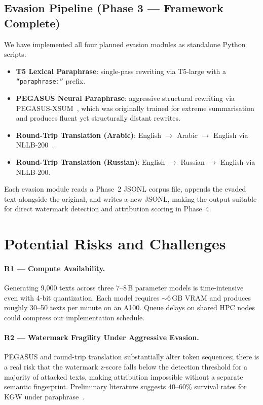 \documentclass[11pt]{article}
\begin{document}
\subsection{Evasion Pipeline (Phase 3 — Framework Complete)}

We have implemented all four planned evasion modules as standalone Python
scripts:

\begin{itemize}
  \item \textbf{T5 Lexical Paraphrase}: single-pass rewriting via T5-large with
    a \texttt{``paraphrase:''} prefix.
  \item \textbf{PEGASUS Neural Paraphrase}: aggressive structural rewriting via
    PEGASUS-XSUM~\cite{zhang2020pegasus}, which was originally trained for
    extreme summarisation and produces fluent yet structurally distant rewrites.
  \item \textbf{Round-Trip Translation (Arabic)}: English $\to$ Arabic $\to$
    English via NLLB-200~\cite{nllbteam2022nllb}.
  \item \textbf{Round-Trip Translation (Russian)}: English $\to$ Russian $\to$
    English via NLLB-200.
\end{itemize}

Each evasion module reads a Phase~2 JSONL corpus file, appends the evaded text
alongside the original, and writes a new JSONL, making the output suitable for
direct watermark detection and attribution scoring in Phase~4.

\section{Potential Risks and Challenges}

\paragraph{R1 — Compute Availability.}
Generating 9{,}000 texts across three 7–8\,B parameter models is time-intensive
even with 4-bit quantization.  Each model requires $\sim$6\,GB VRAM and
produces roughly 30--50 texts per minute on an A100.  Queue delays on shared HPC
nodes could compress our implementation schedule.

\paragraph{R2 — Watermark Fragility Under Aggressive Evasion.}
PEGASUS and round-trip translation substantially alter token sequences; there is
a real risk that the watermark z-score falls below the detection threshold for a
majority of attacked texts, making attribution impossible without a separate
semantic fingerprint.  Preliminary literature suggests 40--60\% survival rates
for KGW under paraphrase~\cite{kirchenbauer2023watermark}.
\end{document}
